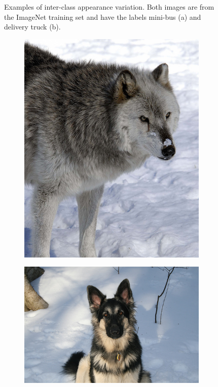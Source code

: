 \begin{figure}[H]
\begin{subfigure}[b]{0.45\textwidth}
        \caption{}\label{fig:inter1b}
    \end{subfigure}
    \caption{Examples of inter-class appearance variation. Both images are from the ImageNet training set \cite{imagenet} and have the labels mini-bus (a) and delivery truck (b).}
    \label{fig:inter1}
\end{figure} 

\begin{figure}[H]
    \centering
    \begin{subfigure}[b]{0.3\textwidth}
        \center
        \includegraphics[width=\textwidth]{Figs/Problem/wolf.jpeg}
        \caption{}\label{fig:inter2a}
    \end{subfigure}
    \begin{subfigure}[b]{0.45\textwidth}
        \center
        \includegraphics[width=\textwidth]{Figs/Problem/germanshepherd.jpeg}

\end{subfigure}
\end{figure}
